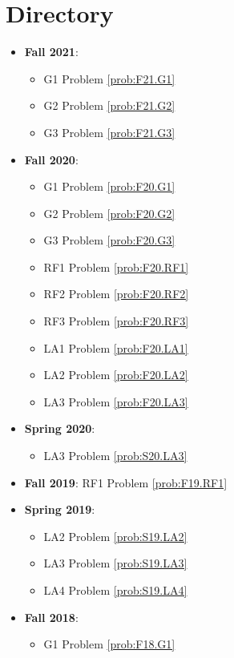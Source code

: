 \documentclass{article}
\theoremstyle{definition}
\begin{document}
\tableofcontents

\section{Directory}

\begin{itemize}
	\item \textbf{Fall 2021}:
	\begin{itemize}
	\item G1 Problem \ref{prob:F21.G1} 
	\item G2 Problem \ref{prob:F21.G2}
	\item G3 Problem \ref{prob:F21.G3}
	\end{itemize}
	\item \textbf{Fall 2020}:
	\begin{itemize}
		\item G1 Problem \ref{prob:F20.G1} 
		\item G2 Problem \ref{prob:F20.G2}
		\item G3 Problem \ref{prob:F20.G3}
		\item RF1 Problem \ref{prob:F20.RF1}
		\item RF2 Problem \ref{prob:F20.RF2}
		\item RF3 Problem \ref{prob:F20.RF3}
		\item LA1 Problem \ref{prob:F20.LA1}
		\item LA2 Problem \ref{prob:F20.LA2}
		\item LA3 Problem \ref{prob:F20.LA3}	
	\end{itemize}
	\item \textbf{Spring 2020}:
	\begin{itemize}
		\item LA3 Problem \ref{prob:S20.LA3}	
	\end{itemize}
	\item \textbf{Fall 2019}: RF1 Problem \ref{prob:F19.RF1}
	\item \textbf{Spring 2019}:
	\begin{itemize}
		\item LA2 Problem \ref{prob:S19.LA2}
		\item LA3 Problem \ref{prob:S19.LA3}
		\item LA4 Problem \ref{prob:S19.LA4}	
	\end{itemize}
	\item \textbf{Fall 2018}: 
	\begin{itemize}
		\item G1 Problem \ref{prob:F18.G1}

\end{itemize}
\end{itemize}
\end{document}
